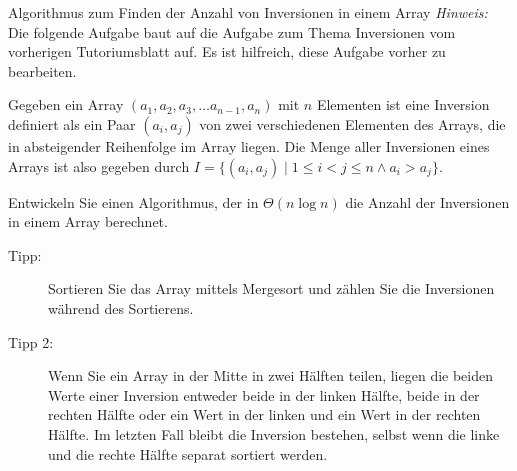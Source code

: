 \documentclass[11pt,a4paper]{article}
\begin{document}
\begin{aufgabe}{4}{Algorithmus zum Finden der Anzahl von Inversionen in einem Array}
    \textit{Hinweis:} Die folgende Aufgabe baut auf die Aufgabe zum Thema Inversionen vom vorherigen Tutoriumsblatt auf.
    Es ist hilfreich, diese Aufgabe vorher zu bearbeiten.

    Gegeben ein Array $(a_1, a_2, a_3, \ldots a_{n - 1}, a_n)$ mit $n$ Elementen ist eine Inversion definiert als ein Paar $(a_i, a_j)$ von zwei verschiedenen Elementen des Arrays, die in absteigender Reihenfolge im Array liegen.
    Die Menge aller Inversionen eines Arrays ist also gegeben durch $I = \{(a_i, a_j) \mid 1 \leq i < j \leq n \wedge a_i > a_j \}$.

    Entwickeln Sie einen Algorithmus, der in $\Theta(n \log n)$ die Anzahl der Inversionen in einem Array berechnet.
    \begin{description}
        \item[Tipp:] Sortieren Sie das Array mittels Mergesort und zählen Sie die Inversionen während des Sortierens.
        \item[Tipp 2:] Wenn Sie ein Array in der Mitte in zwei Hälften teilen, liegen die beiden Werte einer Inversion entweder beide in der linken Hälfte, beide in der rechten Hälfte oder ein Wert in der linken und ein Wert in der rechten Hälfte.
        Im letzten Fall bleibt die Inversion bestehen, selbst wenn die linke und die rechte Hälfte separat sortiert werden. 
    \end{description}
\end{aufgabe}
\end{document}
